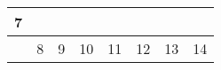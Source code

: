 {\begin{tabularx}{\linewidth}{|l!{\vrule width \myLenLineThicknessThick}*{7}{@{}X@{}|}}
      
      
        \begin{minipage}[t]{6mm}\centering{}7\end{minipage}
      
      
        \\  \hline 
      
    
  
  
  
  \hyperlink{week-2027-10}{} &
    
      
      
        \begin{minipage}[t]{6mm}\centering{}8\end{minipage}
      
       & 
    
      
      
        \begin{minipage}[t]{6mm}\centering{}9\end{minipage}
      
       & 
    
      
      
        \begin{minipage}[t]{6mm}\centering{}10\end{minipage}
      
       & 
    
      
      
        \begin{minipage}[t]{6mm}\centering{}11\end{minipage}
      
       & 
    
      
      
        \begin{minipage}[t]{6mm}\centering{}12\end{minipage}
      
       & 
    
      
      
        \begin{minipage}[t]{6mm}\centering{}13\end{minipage}
      
       & 
    
      
      
        \begin{minipage}[t]{6mm}\centering{}14\end{minipage}
      

\end{tabularx}}
